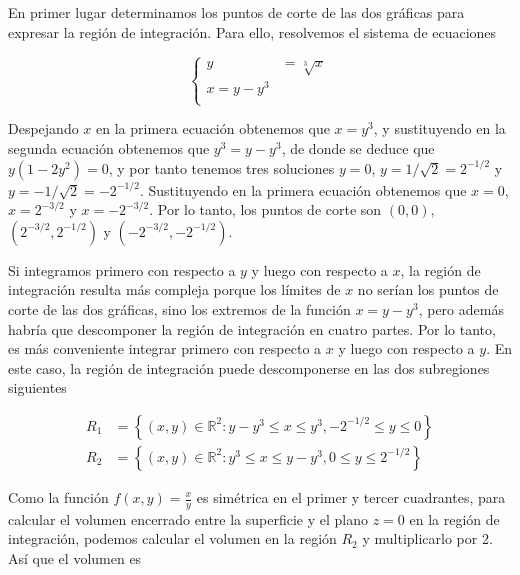 \documentclass[
  a4paper,
]{scrreport}
\theoremstyle{definition}
\theoremstyle{remark}
\begin{document}
\begin{tcolorbox}[enhanced jigsaw, opacityback=0, colframe=quarto-callout-tip-color-frame, colbacktitle=quarto-callout-tip-color!10!white, titlerule=0mm, bottomtitle=1mm, rightrule=.15mm, arc=.35mm, left=2mm, coltitle=black, title=\textcolor{quarto-callout-tip-color}{\faLightbulb}\hspace{0.5em}{Solución}, bottomrule=.15mm, opacitybacktitle=0.6, breakable, toptitle=1mm, leftrule=.75mm, toprule=.15mm, colback=white]

En primer lugar determinamos los puntos de corte de las dos gráficas
para expresar la región de integración. Para ello, resolvemos el sistema
de ecuaciones

\[
\begin{cases}
y &= \sqrt[3]{x}\\
x = y-y^3 \\
\end{cases}
\]

Despejando \(x\) en la primera ecuación obtenemos que \(x=y^3\), y
sustituyendo en la segunda ecuación obtenemos que \(y^3 = y-y^3\), de
donde se deduce que \(y(1-2y^2)=0\), y por tanto tenemos tres soluciones
\(y=0\), \(y=1/\sqrt{2}=2^{-1/2}\) y \(y=-1/\sqrt{2}=-2^{-1/2}\).
Sustituyendo en la primera ecuación obtenemos que \(x=0\),
\(x=2^{-3/2}\) y \(x=-2^{-3/2}\). Por lo tanto, los puntos de corte son
\((0,0)\), \((2^{-3/2}, 2^{-1/2})\) y \((-2^{-3/2}, -2^{-1/2})\).

Si integramos primero con respecto a \(y\) y luego con respecto a \(x\),
la región de integración resulta más compleja porque los límites de
\(x\) no serían los puntos de corte de las dos gráficas, sino los
extremos de la función \(x=y-y^3\), pero además habría que descomponer
la región de integración en cuatro partes. Por lo tanto, es más
conveniente integrar primero con respecto a \(x\) y luego con respecto a
\(y\). En este caso, la región de integración puede descomponerse en las
dos subregiones siguientes

\begin{align*}
R_1 &= \left\{ (x,y) \in \mathbb{R}^2:  y-y^3 \leq x \leq y^3, -2^{-1/2} \leq y \leq 0 \right\} \\
R_2 &= \left\{ (x,y) \in \mathbb{R}^2:  y^3 \leq x \leq y-y^3, 0 \leq y \leq 2^{-1/2} \right\}
\end{align*}

Como la función \(f(x,y)=\frac{x}{y}\) es simétrica en el primer y
tercer cuadrantes, para calcular el volumen encerrado entre la
superficie y el plano \(z=0\) en la región de integración, podemos
calcular el volumen en la región \(R_2\) y multiplicarlo por 2. Así que
el volumen es


\end{tcolorbox}
\end{document}
